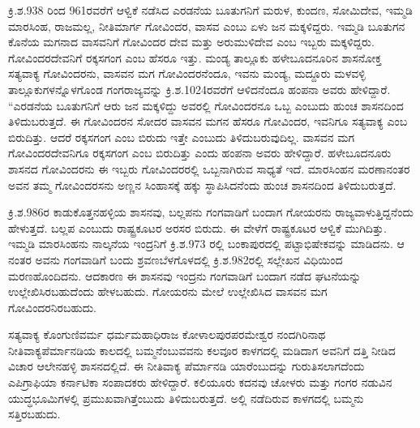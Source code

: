 ಕ್ರಿ.ಶ.938 ರಿಂದ 961ರವರೆಗೆ ಆಳ್ವಿಕೆ ನಡೆಸಿದ ಎರಡನೆಯ ಬೂತುಗನಿಗೆ ಮರುಳ, ಕುಂದಣ, ಸೋಮಿದೇವ, ಇಮ್ಮಡಿ ಮಾರಸಿಂಹ, ರಾಜಮಲ್ಲ, ನೀತಿಮಾರ್ಗ ಗೋವಿಂದರ, ವಾಸವ ಎಂಬು ಏಳು ಜನ ಮಕ್ಕಳಿದ್ದರು. ಇಮ್ಮಡಿ ಬೂತುಗನ ಕೊನೆಯ ಮಗನಾದ ವಾಸವನಿಗೆ ಗೋವಿಂದರ ದೇವ ಮತ್ತು ಅರುಮುಳಿದೇವ ಎಂಬ ಇಬ್ಬರು ಮಕ್ಕಳಿದ್ದರು. ಗೋವಿಂದರದೇವನಿಗೆ ರಕ್ಕಸಗಂಗ ಎಂಬ ಹೆಸರೂ ಇತ್ತು. ಮಂಡ್ಯ ತಾಲ್ಲೂಕು ಹಳೇಬೂದನೂರಿನ ಶಾಸನೋಕ್ತ ಸತ್ಯವಾಕ್ಯ ಗೋವಿಂದರನು, ವಾಸವನ ಮಗ ಗೋವಿಂದರನೆಂದೂ, ಇವನು ಮಂಡ್ಯ, ಮದ್ದೂರು ಮಳವಳ್ಳಿ ತಾಲ್ಲೂಕುಗಳನ್ನೊಳಗೊಂಡ ಗಂಗರಾಜ್ಯವನ್ನು ಕ್ರಿ.ಶ.1024ರವರೆಗೆ ಆಳಿದನೆಂದೂ ಹಂಪನಾ ಅವರು ಹೇಳಿದ್ದಾರೆ. “ಎರಡನೆಯ ಬೂತುಗನಿಗೆ ಆರು ಜನ ಮಕ್ಕಳಿದ್ದು ಅವರಲ್ಲಿ ಗೋವಿಂದರನೂ ಒಬ್ಬ ಎಂಬುದು ಹುಂಚ ಶಾಸನದಿಂದ ತಿಳಿದುಬರುತ್ತದೆ. ಈ ಗೋವಿಂದರನ ಸೋದರ ವಾಸವನ ಮಗನ ಹೆಸರೂ ಗೋವಿಂದರ, ಇವನಿಗೂ ಸತ್ಯವಾಕ್ಯ ಎಂಬ ಬಿರುದಿತ್ತು. ಆದರೆ ರಕ್ಕಸಗಂಗ ಎಂಬ ಬಿರುದು ಇತ್ತೇ ಎಂಬುದು ತಿಳಿದುಬರುವುದಿಲ್ಲ. ವಾಸವನ ಮಗ ಗೋವಿಂದರದೇವನಿಗೂ ರಕ್ಕಸಗಂಗ ಎಂಬ ಬಿರುದಿತ್ತು ಎಂದು ಹಂಪನಾ ಅವರು ಹೇಳಿದ್ದಾರೆ. ಹಳೇಬೂದನೂರು ಶಾಸನದ ಗೋವಿಂದರನು ಈ ಇಬ್ಬರು ಗೋವಿಂದರರಲ್ಲಿ ಒಬ್ಬನಾಗಿರುವ ಸಾಧ್ಯತೆ ಇದೆ. ಮಾರಸಿಂಹನ ಮರಣಾನಂತರ ಅವನ ತಮ್ಮ ಗೋವಿಂದರಸನು ಅಣ್ಣನ ಸಿಂಹಾಸಕ್ಕೆ ಹಕ್ಕು ಸ್ಥಾಪಿಸಿದನೆಂದು ಹುಂಚ ಶಾಸನದಿಂದ ತಿಳಿದುಬರುತ್ತದೆ.

ಕ್ರಿ.ಶ.986ರ ಕಾಡುಕೊತ್ತನಹಳ್ಳಿಯ ಶಾಸನವು, ಬಲ್ಲಪನು ಗಂಗವಾಡಿಗೆ ಬಂದಾಗ ಗೋಯರನು ರಾಜ್ಯವಾಳುತ್ತಿದ್ದ\-ನೆಂದು ಹೇಳುತ್ತದೆ. ಬಲ್ಲಪ ಎಂಬುದು ರಾಷ್ಟ್ರಕೂಟರ ಅರಸರ ಬಿರುದು. ಈ ವೇಳೆಗೆ ರಾಷ್ಟ್ರಕೂಟರ ಆಳ್ವಿಕೆ ಮುಗಿದಿತ್ತು. ಇಮ್ಮಡಿ ಮಾರಸಿಂಹನು ನಾಲ್ಕನೆಯ ಇಂದ್ರನಿಗೆ ಕ್ರಿ.ಶ.973 ರಲ್ಲಿ ಬಂಕಾಪುರದಲ್ಲಿ ಪಟ್ಟಾಭಿಷೇಕವನ್ನು ಮಾಡಿದನು. ಆ ನಂತರ ಅವನು ಗಂಗವಾಡಿಗೆ ಬಂದು ಶ್ರವಣಬೆಳಗೊಳದಲ್ಲಿ ಕ್ರಿ.ಶ.982ರಲ್ಲಿ ಸಲ್ಲೇಖನ ವಿಧಿಯಿಂದ ಮರಣಹೊಂದಿದನು. ಆದಕಾರಣ ಈ ಶಾಸನವು ಇಂದ್ರನು ಗಂಗವಾಡಿಗೆ ಬಂದಾಗ ನಡೆದ ಘಟನೆಯನ್ನು ಉಲ್ಲೇಖಿಸಿರಬಹುದೆಂದು ಹೇಳಬಹುದು. ಗೋಯರನು ಮೇಲೆ ಉಲ್ಲೇಖಿಸಿದ ವಾಸವನ ಮಗ ಗೋವಿಂದರನಿರಬಹುದು.

ಸತ್ಯವಾಕ್ಯ ಕೊಂಗುಣಿವರ್ಮ ಧರ್ಮಮಹಾಧಿರಾಜ ಕೋಳಾಲಪುರಪರಮೇಶ್ವರ ನಂದಗಿರಿನಾಥ ನೀತಿವಾಕ್ಯ\break ಪೆರ್ಮಾನಡಿಯ ಕಾಲದಲ್ಲಿ ಬಮ್ಮನೆಂಬುವವನು ಕಲವೂರ ಕಾಳಗದಲ್ಲಿ ಮಡಿದಾಗ ಅವನಿಗೆ ದತ್ತಿ ನೀಡಿದ ವಿಚಾರ ಆಲೇನಹಳ್ಳಿ ಶಾಸನದಲ್ಲಿದೆ. ಈ ನೀತಿವಾಕ್ಯ ಪೆರ್ಮಾನಡಿ ಯಾರೆಂಬುದನ್ನು ಗುರುತಿಸಲಾಗದೆಂದು ಎಪಿಗ್ರಾಫಿಯಾ ಕರ್ನಾಟಿಕಾ ಸಂಪಾದಕರು ಹೇಳಿದ್ದಾರೆ. ಕಲಿಯೂರು ಕದನವು ಚೋಳರು ಮತ್ತು ಗಂಗರ ನಡುವಿನ ಯುದ್ಧಭೂಮಿಗಳಲ್ಲಿ ಪ್ರಮುಖವಾಗಿ\-ತ್ತೆಂಬುದು ತಿಳಿದುಬರುತ್ತದೆ. ಅಲ್ಲಿ ನಡೆದಿರುವ ಕಾಳಗದಲ್ಲಿ ಬಮ್ಮನು ಸತ್ತಿರಬಹುದು.

\newpage

